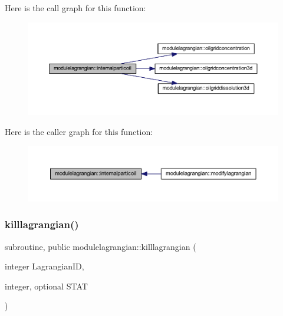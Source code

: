 Here is the call graph for this function\+:\nopagebreak
\begin{figure}[H]
\begin{center}
\leavevmode
\includegraphics[width=350pt]{namespacemodulelagrangian_a370ee1f0e073c2f783b4f91c7aee40f1_cgraph}
\end{center}
\end{figure}
Here is the caller graph for this function\+:\nopagebreak
\begin{figure}[H]
\begin{center}
\leavevmode
\includegraphics[width=350pt]{namespacemodulelagrangian_a370ee1f0e073c2f783b4f91c7aee40f1_icgraph}
\end{center}
\end{figure}
\mbox{\label{namespacemodulelagrangian_a18d99349731a3f837e18c16f49c3743f}} 
\subsubsection{\texorpdfstring{killlagrangian()}{killlagrangian()}}
{\footnotesize\ttfamily subroutine, public modulelagrangian\+::killlagrangian (\begin{DoxyParamCaption}\item[{integer}]{Lagrangian\+ID,  }\item[{integer, optional}]{S\+T\+AT }\end{DoxyParamCaption})}

